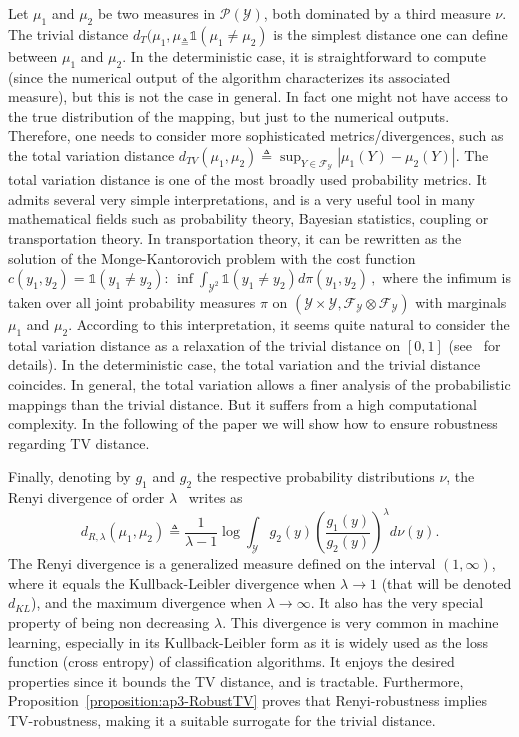 Let  $\mu_1$ and $\mu_2$ be two measures in $\mathcal{P}(\mathcal{Y})$, both dominated by a third measure $\nu$.
The trivial distance $ d_{T}(\mu_1,\mu_ \triangleq \mathds{1}\left(\mu_1 \neq \mu_2\right)$ is the simplest distance one can define between $\mu_1$ and $\mu_2$.
In the deterministic case, it is straightforward to compute (since the numerical output of the algorithm characterizes its associated measure), but this is not the case in general.
In fact one might not have access to the true distribution of the mapping, but just to the numerical outputs.
Therefore, one needs to consider more sophisticated metrics/divergences, such as the total variation distance $d_{TV}(\mu_1,\mu_2) \triangleq \sup_{Y \in \mathcal{F}_{\mathcal{Y}}} |\mu_1 (Y) - \mu_2(Y)|$.
The total variation distance is one of the most broadly used probability metrics.
It admits several very simple interpretations, and is a very useful tool in many mathematical fields such as probability theory, Bayesian statistics, coupling or transportation theory.
In transportation theory, it can be rewritten as the solution of the Monge-Kantorovich problem with the cost function $c(y_1,y_2) =\mathds{1}\left(y_1 \neq y_2\right)$: $ \inf\int_{\mathcal{Y}^{2}}\mathds{1}\left(y_1 \neq y_2\right) d\pi(y_1,y_2)\, ,$ where the infimum is taken over all joint probability measures $\pi$ on $(\mathcal{Y}\times \mathcal{Y}, \mathcal{F}_{\mathcal{Y} } \otimes \mathcal{F}_{\mathcal{Y}})$ with marginals $\mu_1$ and $\mu_2$.
According to this interpretation, it seems quite natural to consider the total variation distance as a relaxation of the trivial distance on $[0,1]$ (see~\cite{villani2008optimal} for details).
In the deterministic case, the total variation and the trivial distance coincides.
In general, the total variation allows a finer analysis of the probabilistic mappings than the trivial distance.
But it suffers from a high computational complexity.
In the following of the paper we will show how to ensure robustness regarding TV distance.

Finally, denoting by $g_1$ and $g_2$ the respective probability distributions \wrt $\nu$, the Renyi divergence of order $\lambda$~\cite{renyi1961} writes as  
\begin{equation}
  d_{R,\lambda}(\mu_1,\mu_2) \triangleq \frac{1}{\lambda -1}\log \int_{\mathcal{Y}} g_2(y)  \left(\frac{g_1(y)}{g_2(y)}\right)^{\lambda} d\nu(y).
\end{equation}
The Renyi divergence is a generalized measure defined on the interval $(1,\infty)$, where it equals the Kullback-Leibler divergence when $\lambda \rightarrow 1$ (that will be denoted $d_{KL}$), and the maximum divergence when $\lambda \rightarrow \infty$.
It also has the very special property of being non decreasing \wrt $\lambda$.
This divergence is very common in machine learning, especially in its Kullback-Leibler form as it is widely used as the loss function (cross entropy) of classification algorithms.
It enjoys the desired properties  since it bounds the TV distance, and is tractable.
Furthermore, Proposition~\ref{proposition:ap3-RobustTV} proves that Renyi-robustness implies TV-robustness, making it a suitable surrogate for the trivial distance.

